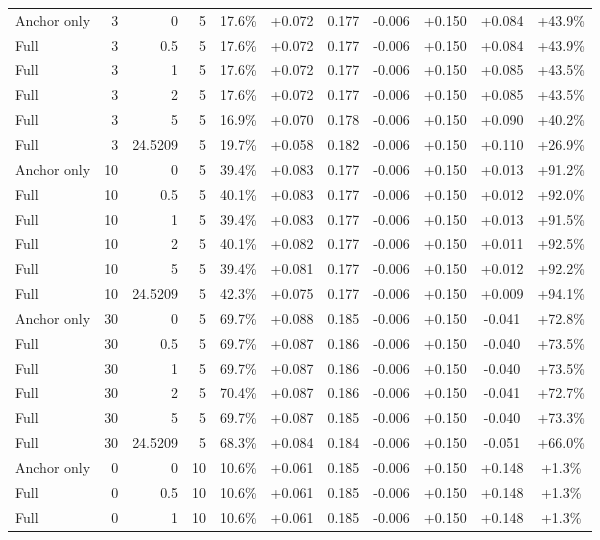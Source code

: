 \begin{table}[htbp]
\begin{tabular}{lrrrccccccc}
Anchor only & 3 & 0 & 5 & 17.6\% & +0.072 & 0.177 & -0.006 & +0.150 & +0.084 & +43.9\% \\
Full & 3 & 0.5 & 5 & 17.6\% & +0.072 & 0.177 & -0.006 & +0.150 & +0.084 & +43.9\% \\
Full & 3 & 1 & 5 & 17.6\% & +0.072 & 0.177 & -0.006 & +0.150 & +0.085 & +43.5\% \\
Full & 3 & 2 & 5 & 17.6\% & +0.072 & 0.177 & -0.006 & +0.150 & +0.085 & +43.5\% \\
Full & 3 & 5 & 5 & 16.9\% & +0.070 & 0.178 & -0.006 & +0.150 & +0.090 & +40.2\% \\
Full & 3 & 24.5209 & 5 & 19.7\% & +0.058 & 0.182 & -0.006 & +0.150 & +0.110 & +26.9\% \\
Anchor only & 10 & 0 & 5 & 39.4\% & +0.083 & 0.177 & -0.006 & +0.150 & +0.013 & +91.2\% \\
Full & 10 & 0.5 & 5 & 40.1\% & +0.083 & 0.177 & -0.006 & +0.150 & +0.012 & +92.0\% \\
Full & 10 & 1 & 5 & 39.4\% & +0.083 & 0.177 & -0.006 & +0.150 & +0.013 & +91.5\% \\
Full & 10 & 2 & 5 & 40.1\% & +0.082 & 0.177 & -0.006 & +0.150 & +0.011 & +92.5\% \\
Full & 10 & 5 & 5 & 39.4\% & +0.081 & 0.177 & -0.006 & +0.150 & +0.012 & +92.2\% \\
Full & 10 & 24.5209 & 5 & 42.3\% & +0.075 & 0.177 & -0.006 & +0.150 & +0.009 & +94.1\% \\
Anchor only & 30 & 0 & 5 & 69.7\% & +0.088 & 0.185 & -0.006 & +0.150 & -0.041 & +72.8\% \\
Full & 30 & 0.5 & 5 & 69.7\% & +0.087 & 0.186 & -0.006 & +0.150 & -0.040 & +73.5\% \\
Full & 30 & 1 & 5 & 69.7\% & +0.087 & 0.186 & -0.006 & +0.150 & -0.040 & +73.5\% \\
Full & 30 & 2 & 5 & 70.4\% & +0.087 & 0.186 & -0.006 & +0.150 & -0.041 & +72.7\% \\
Full & 30 & 5 & 5 & 69.7\% & +0.087 & 0.185 & -0.006 & +0.150 & -0.040 & +73.3\% \\
Full & 30 & 24.5209 & 5 & 68.3\% & +0.084 & 0.184 & -0.006 & +0.150 & -0.051 & +66.0\% \\
Anchor only & 0 & 0 & 10 & 10.6\% & +0.061 & 0.185 & -0.006 & +0.150 & +0.148 & +1.3\% \\
Full & 0 & 0.5 & 10 & 10.6\% & +0.061 & 0.185 & -0.006 & +0.150 & +0.148 & +1.3\% \\
Full & 0 & 1 & 10 & 10.6\% & +0.061 & 0.185 & -0.006 & +0.150 & +0.148 & +1.3\% \\

\end{tabular}
\end{table}

